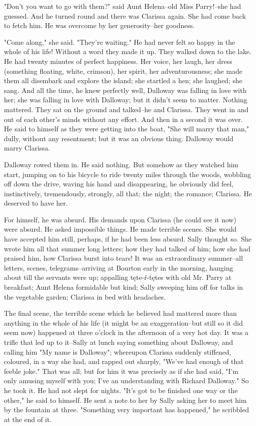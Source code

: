 \documentclass[lang=cn,10pt]{elegantbook}
\begin{document}
"Don't you want to go with them?" said Aunt Helena--old Miss
Parry!--she had guessed.  And he turned round and there was
Clarissa again.  She had come back to fetch him.  He was overcome
by her generosity--her goodness.

"Come along," she said.  "They're waiting."  He had never felt so
happy in the whole of his life!  Without a word they made it up.
They walked down to the lake.  He had twenty minutes of perfect
happiness.  Her voice, her laugh, her dress (something floating,
white, crimson), her spirit, her adventurousness; she made them all
disembark and explore the island; she startled a hen; she laughed;
she sang.  And all the time, he knew perfectly well, Dalloway was
falling in love with her; she was falling in love with Dalloway;
but it didn't seem to matter.  Nothing mattered.  They sat on the
ground and talked--he and Clarissa.  They went in and out of each
other's minds without any effort.  And then in a second it was
over.  He said to himself as they were getting into the boat, "She
will marry that man," dully, without any resentment; but it was an
obvious thing.  Dalloway would marry Clarissa.

Dalloway rowed them in.  He said nothing.  But somehow as they
watched him start, jumping on to his bicycle to ride twenty miles
through the woods, wobbling off down the drive, waving his hand and
disappearing, he obviously did feel, instinctively, tremendously,
strongly, all that; the night; the romance; Clarissa.  He deserved
to have her.

For himself, he was absurd.  His demands upon Clarissa (he could
see it now) were absurd.  He asked impossible things.  He made
terrible scenes.  She would have accepted him still, perhaps, if he
had been less absurd.  Sally thought so.  She wrote him all that
summer long letters; how they had talked of him; how she had
praised him, how Clarissa burst into tears!  It was an extraordinary
summer--all letters, scenes, telegrams--arriving at Bourton early in
the morning, hanging about till the servants were up; appalling
tęte-ŕ-tętes with old Mr. Parry at breakfast; Aunt Helena formidable
but kind; Sally sweeping him off for talks in the vegetable garden;
Clarissa in bed with headaches.

The final scene, the terrible scene which he believed had mattered
more than anything in the whole of his life (it might be an
exaggeration--but still so it did seem now) happened at three
o'clock in the afternoon of a very hot day.  It was a trifle that
led up to it--Sally at lunch saying something about Dalloway, and
calling him "My name is Dalloway"; whereupon Clarissa suddenly
stiffened, coloured, in a way she had, and rapped out sharply,
"We've had enough of that feeble joke."  That was all; but for him
it was precisely as if she had said, "I'm only amusing myself with
you; I've an understanding with Richard Dalloway."  So he took it.
He had not slept for nights.  "It's got to be finished one way or
the other," he said to himself.  He sent a note to her by Sally
asking her to meet him by the fountain at three.  "Something very
important has happened," he scribbled at the end of it.
\end{document}
